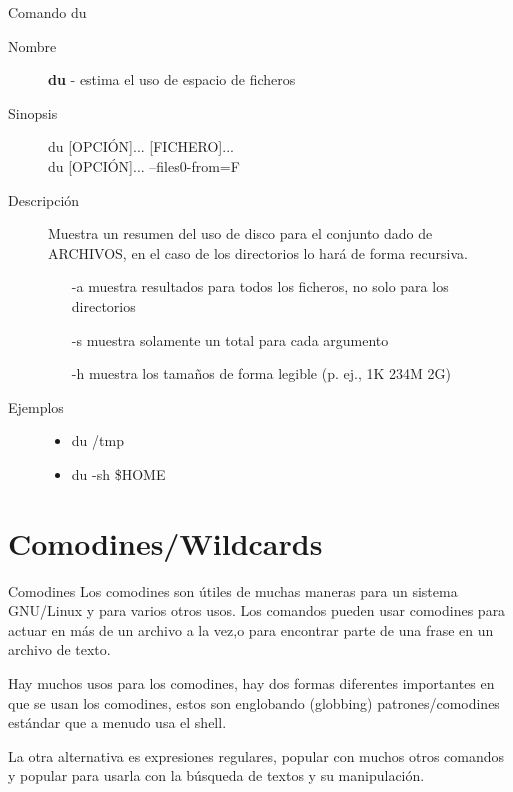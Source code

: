 \begin{frame}[c]{Comando du}
  \begin{description}
    \item[Nombre]
      \textbf{du} - estima el uso de espacio de ficheros

    \vspace{\baselineskip}
    \item[Sinopsis]
      du [OPCIÓN]... [FICHERO]... \\
      du [OPCIÓN]... --files0-from=F

    \vspace{\baselineskip}
    \item[Descripción]
      Muestra un resumen del uso de disco para el conjunto dado de ARCHIVOS,
      en el caso de los directorios lo hará de forma recursiva.

      \begin{itemize}
        \item [-a] muestra resultados para todos los ficheros,
          no solo para los directorios
        \item [-s] muestra solamente un total para cada argumento
        \item [-h] muestra los tamaños de forma legible (p. ej., 1K 234M 2G)
      \end{itemize}

    \vspace{\baselineskip}
    \item[Ejemplos]
      \begin{itemize}
        \item du /tmp
        \item du -sh \$HOME
      \end{itemize}
  \end{description}
\end{frame}


\section{Comodines/Wildcards}

\begin{frame}[c]{Comodines}
  Los comodines son útiles de muchas maneras para un sistema GNU/Linux y
  para varios otros usos. Los comandos pueden usar comodines para actuar
  en más de un archivo a la vez,o para encontrar parte de una frase en un
  archivo de texto.

  \vspace{\baselineskip}
  Hay muchos usos para los comodines, hay dos formas diferentes importantes
  en que se usan los comodines, estos son englobando (globbing)
  patrones/comodines estándar que a menudo usa el shell.

  \vspace{\baselineskip}
  La otra alternativa es expresiones regulares, popular con muchos otros
  comandos y popular para usarla con la búsqueda de textos y su
  manipulación.
\end{frame}

